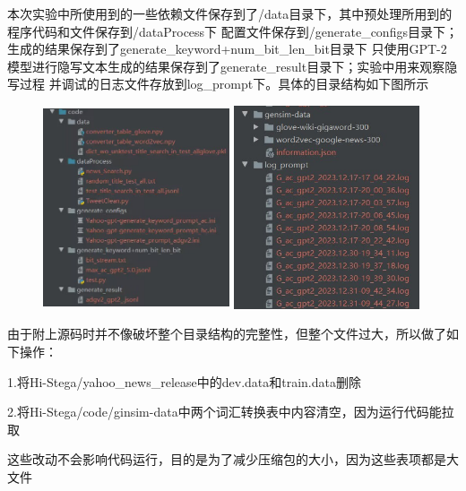 \documentclass[a4paper,11pt,UTF8]{ctexart}
\begin{document}
    本次实验中所使用到的一些依赖文件保存到了/data目录下，其中预处理所用到的程序代码和文件保存到/dataProcess下
    配置文件保存到/generate\_configs目录下；生成的结果保存到了generate\_keyword+num\_bit\_len\_bit目录下
    只使用GPT-2模型进行隐写文本生成的结果保存到了generate\_result目录下；实验中用来观察隐写过程
    并调试的日志文件存放到log\_prompt下。具体的目录结构如下图所示
    \begin{figure}[H]
      \begin{minipage}[t]{0.45\linewidth}
          \centering
          \includegraphics[width=5.5cm,height=6cm]{代码结构3.png}
      \end{minipage}
      \begin{minipage}[t]{0.45\linewidth}        %
          \hspace{10pt}
          \includegraphics[width=5.5cm,height=6cm]{代码结构4.png}
      \end{minipage}
    \end{figure}

    由于附上源码时并不像破坏整个目录结构的完整性，但整个文件过大，所以做了如下操作：\par
    1.将Hi-Stega/yahoo\_news\_release中的dev.data和train.data删除\par
    2.将Hi-Stega/code/ginsim-data中两个词汇转换表中内容清空，因为运行代码能拉取\par
    这些改动不会影响代码运行，目的是为了减少压缩包的大小，因为这些表项都是大文件
\end{document}
